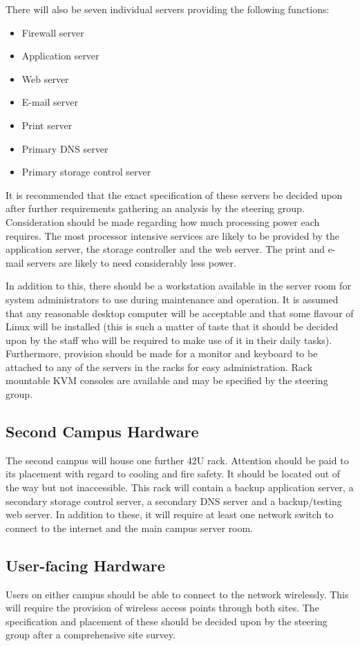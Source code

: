 \documentclass[a4paper, twoside]{article}
\begin{document}
There will also be seven individual servers providing the following functions:
\begin{itemize}
\item{Firewall server}
\item{Application server}
\item{Web server}
\item{E-mail server}
\item{Print server}
\item{Primary DNS server}
\item{Primary storage control server}
\end{itemize}
It is recommended that the exact specification of these servers be decided upon
after further requirements gathering an analysis by the steering group.
Consideration should be made regarding how much processing power each requires.
The most processor intensive services are likely to be provided by the
application server, the storage controller and the web server. The print and
e-mail servers are likely to need considerably less power.

In addition to this, there should be a workstation available in the server room
for system administrators to use during maintenance and operation. It is assumed
that any reasonable desktop computer will be acceptable and that some flavour of
Linux will be installed (this is such a matter of taste that it should be
decided upon by the staff who will be required to make use of it in their daily
tasks). Furthermore, provision should be made for a monitor and keyboard to be
attached to any of the servers in the racks for easy administration. Rack
mountable KVM consoles are available and may be specified by the steering group.

\subsection{Second Campus Hardware}
The second campus will house one further 42U rack. Attention should be paid to
its placement with regard to cooling and fire safety. It should be located out
of the way but not inaccessible. This rack will contain a backup application
server, a secondary storage control server, a secondary DNS server and a
backup/testing web server. In addition to these, it will require at least one
network switch to connect to the internet and the main campus server room.

\subsection{User-facing Hardware}
Users on either campus should be able to connect to the network wirelessly. This
will require the provision of wireless access points through both sites. The
specification and placement of these should be decided upon by the steering
group after a comprehensive site survey.
\end{document}

